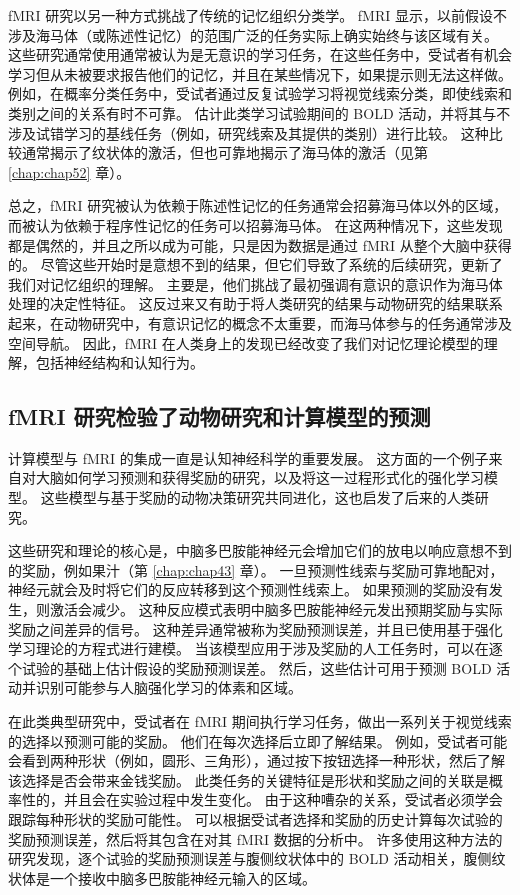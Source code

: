 fMRI 研究以另一种方式挑战了传统的记忆组织分类学。 
fMRI 显示，以前假设不涉及海马体（或陈述性记忆）的范围广泛的任务实际上确实始终与该区域有关。 
这些研究通常使用通常被认为是无意识的学习任务，在这些任务中，受试者有机会学习但从未被要求报告他们的记忆，并且在某些情况下，如果提示则无法这样做。 
例如，在概率分类任务中，受试者通过反复试验学习将视觉线索分类，即使线索和类别之间的关系有时不可靠。 
估计此类学习试验期间的 BOLD 活动，并将其与不涉及试错学习的基线任务（例如，研究线索及其提供的类别）进行比较。 
这种比较通常揭示了纹状体的激活，但也可靠地揭示了海马体的激活（见第 \ref{chap:chap52} 章）。


总之，fMRI 研究被认为依赖于陈述性记忆的任务通常会招募海马体以外的区域，而被认为依赖于程序性记忆的任务可以招募海马体。 
在这两种情况下，这些发现都是偶然的，并且之所以成为可能，只是因为数据是通过 fMRI 从整个大脑中获得的。 
尽管这些开始时是意想不到的结果，但它们导致了系统的后续研究，更新了我们对记忆组织的理解。 
主要是，他们挑战了最初强调有意识的意识作为海马体处理的决定性特征。 
这反过来又有助于将人类研究的结果与动物研究的结果联系起来，在动物研究中，有意识记忆的概念不太重要，而海马体参与的任务通常涉及空间导航。 
因此，fMRI 在人类身上的发现已经改变了我们对记忆理论模型的理解，包括神经结构和认知行为。


\subsection{fMRI 研究检验了动物研究和计算模型的预测}
计算模型与 fMRI 的集成一直是认知神经科学的重要发展。 
这方面的一个例子来自对大脑如何学习预测和获得奖励的研究，以及将这一过程形式化的强化学习模型。 
这些模型与基于奖励的动物决策研究共同进化，这也启发了后来的人类研究。


这些研究和理论的核心是，中脑多巴胺能神经元会增加它们的放电以响应意想不到的奖励，例如果汁（第 \ref{chap:chap43} 章）。 
一旦预测性线索与奖励可靠地配对，神经元就会及时将它们的反应转移到这个预测性线索上。 
如果预测的奖励没有发生，则激活会减少。 
这种反应模式表明中脑多巴胺能神经元发出预期奖励与实际奖励之间差异的信号。 
这种差异通常被称为奖励预测误差，并且已使用基于强化学习理论的方程式进行建模。 
当该模型应用于涉及奖励的人工任务时，可以在逐个试验的基础上估计假设的奖励预测误差。 
然后，这些估计可用于预测 BOLD 活动并识别可能参与人脑强化学习的体素和区域。


在此类典型研究中，受试者在 fMRI 期间执行学习任务，做出一系列关于视觉线索的选择以预测可能的奖励。 
他们在每次选择后立即了解结果。 
例如，受试者可能会看到两种形状（例如，圆形、三角形），通过按下按钮选择一种形状，然后了解该选择是否会带来金钱奖励。 
此类任务的关键特征是形状和奖励之间的关联是概率性的，并且会在实验过程中发生变化。 
由于这种嘈杂的关系，受试者必须学会跟踪每种形状的奖励可能性。 
可以根据受试者选择和奖励的历史计算每次试验的奖励预测误差，然后将其包含在对其 fMRI 数据的分析中。 
许多使用这种方法的研究发现，逐个试验的奖励预测误差与腹侧纹状体中的 BOLD 活动相关，腹侧纹状体是一个接收中脑多巴胺能神经元输入的区域。


